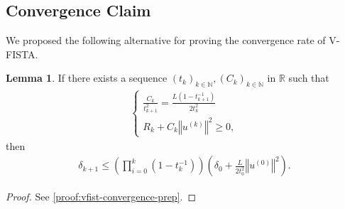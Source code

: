 \documentclass[]{article}
\theoremstyle{definition}
\newtheorem{lemma}{Lemma}[subsection]           %
\numberwithin{equation}{subsection}
\begin{document}
    \subsection{Convergence Claim}
        We proposed the following alternative for proving the convergence rate of V-FISTA. 
        \begin{lemma}\label{lemma:convergence-prep}
            If there exists a sequence $(t_k)_{k\in \mathbb N}, (C_k)_{k\in \mathbb N}$ in $\mathbb R$ such that 
            \begin{align}
                \begin{cases}
                    \frac{C_k}{t_{k + 1}^2} = \frac{L(1 - t^{-1}_{k + 1})}{2t_{k}^2}
                    \\
                    R_k + C_k\left\Vert
                        u^{(k)}
                    \right\Vert^2 \ge 0, 
                \end{cases}
            \end{align}
            then 
            \begin{align*}
                \delta_{k + 1}
                \le 
                \left(
                    \prod_{i = 0}^{k} (1 - t_k^{-1})
                \right)\left(
                    \delta_0 + \frac{L}{2t_0^2}\left\Vert
                        u^{(0)}
                    \right\Vert^2
                \right). 
            \end{align*}
        \end{lemma}
        \begin{proof}
            See \hyperref[proof:vfist-convergence-prep]{\ref*{proof:vfist-convergence-prep}}.    
        \end{proof}
        
\end{document}
